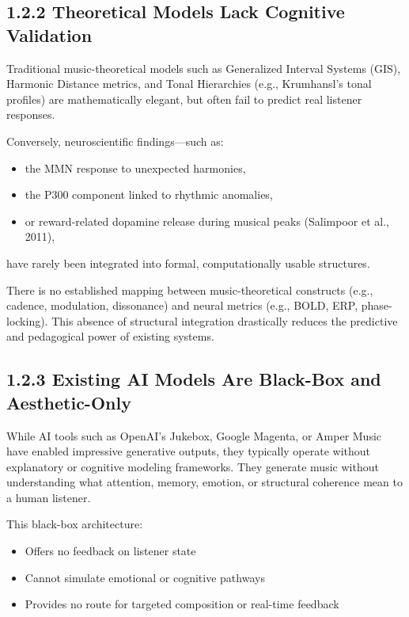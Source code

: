 \subsection*{1.2.2 Theoretical Models Lack Cognitive Validation}

Traditional music-theoretical models such as Generalized Interval Systems (GIS), Harmonic Distance metrics, and Tonal Hierarchies (e.g., Krumhansl’s tonal profiles) are mathematically elegant, but often fail to predict real listener responses.

Conversely, neuroscientific findings—such as:

\begin{itemize}
    \item the MMN response to unexpected harmonies,
    \item the P300 component linked to rhythmic anomalies,
    \item or reward-related dopamine release during musical peaks (Salimpoor et al., 2011),
\end{itemize}

have rarely been integrated into formal, computationally usable structures.

There is no established mapping between music-theoretical constructs (e.g., cadence, modulation, dissonance) and neural metrics (e.g., BOLD, ERP, phase-locking). This absence of structural integration drastically reduces the predictive and pedagogical power of existing systems.

\subsection*{1.2.3 Existing AI Models Are Black-Box and Aesthetic-Only}

While AI tools such as OpenAI’s Jukebox, Google Magenta, or Amper Music have enabled impressive generative outputs, they typically operate without explanatory or cognitive modeling frameworks. They generate music without understanding what attention, memory, emotion, or structural coherence mean to a human listener.

This black-box architecture:

\begin{itemize}
    \item Offers no feedback on listener state
    \item Cannot simulate emotional or cognitive pathways
    \item Provides no route for targeted composition or real-time feedback
\end{itemize}

